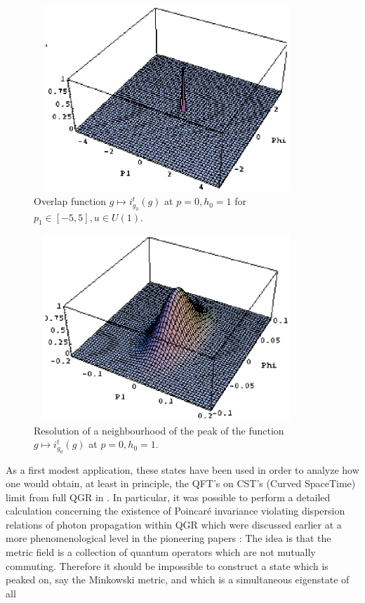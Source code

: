 \documentclass[12pt]{report}
\begin{document}
\begin{figure}
\includegraphics[width=10cm,height=7cm]{proc9fig16.ps}
\caption{Overlap function $g\mapsto i^t_{g_0}(g)$ at $p=0,h_0=1$
for $p_1\in [-5,5],u\in U(1)$.}
\label{f16}
\end{figure}
%
\begin{figure}
\includegraphics[width=10cm,height=7cm]{proc9fig17.ps}
\caption{Resolution of a neighbourhood of the peak of the 
function $g\mapsto i^t_{g_0}(g)$ at $p=0,h_0=1$.}
\label{f17}
\end{figure}
%
As a first modest application, these states have been used in order to 
analyze how one would obtain, at least in principle, the QFT's on CST's 
(Curved SpaceTime)
limit from full QGR in \cite{42}. In particular,
it was possible to perform a detailed calculation concerning the 
existence of Poincar\'e invariance violating dispersion relations of
photon propagation within QGR which were discussed earlier at a more
phenomenological level in the pioneering papers \cite{66}: The idea is that 
the metric field is a collection of  
quantum operators which are not mutually commuting. Therefore
it should be impossible to construct a state which is peaked on, say the 
Minkowski metric, and which is a simultaneous eigenstate of all 
\end{document}
